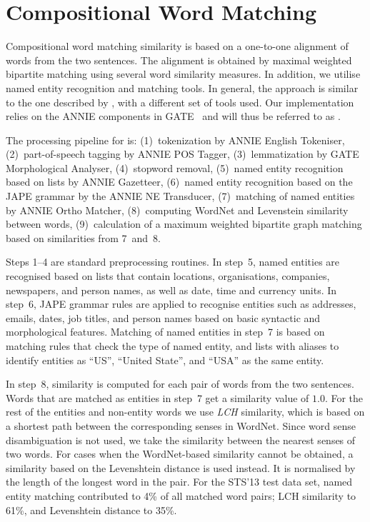 \section{Compositional Word Matching}
\label{gleb-feats}

Compositional word matching similarity is based on a one-to-one alignment of words from the two sentences. The alignment is obtained by maximal weighted bipartite matching using several word similarity measures. In addition, we utilise named entity recognition and matching tools. In general, the approach is similar to the one described by \citet{Karnick2012}, with a different set of tools used. 
Our implementation relies on the ANNIE components in GATE~\citep{CunninghamEA:02} 
and will thus be referred to as .

The processing pipeline for  is:  
(1)~tokenization by ANNIE English Tokeniser, 
(2)~part-of-speech tagging by ANNIE POS Tagger, 
(3)~lemmatization by GATE Morphological Analyser, 
(4)~stopword removal, 
(5)~named entity recognition based on lists by ANNIE Gazetteer, 
(6)~named entity recognition based on the JAPE grammar by the ANNIE NE Transducer, 
(7)~matching of named entities by ANNIE Ortho Matcher, 
(8)~computing WordNet and Levenstein similarity between words, 
(9)~calculation of a maximum weighted bipartite graph matching based on similarities from 7~and~8. 

Steps 1--4 are standard preprocessing routines. 
In step~5, named entities are recognised based on lists that contain locations, organisations, companies, newspapers, and person names, as well as date, time and currency units. 
In step~6, JAPE grammar rules are applied to recognise entities such as addresses, emails, dates, job titles, and person names based on basic syntactic and morphological features. 
Matching of named entities in step~7 is based on matching rules that check the type of named entity, and lists with aliases to identify entities as ``US'', ``United State'', and ``USA'' as the same entity. 

In step~8, similarity is computed for each pair of words from the two sentences. Words that are matched as entities in step~7 get a similarity value of $1.0$. 
For the rest of the entities and non-entity words we use \emph{LCH\/} \citep{Leacock1998} similarity, which is based on a shortest path between the corresponding senses in WordNet. Since word sense disambiguation is not used, we take the similarity between the nearest senses of two words.
For cases when the WordNet-based similarity cannot be obtained, a similarity based on the Levenshtein distance \citep{Levenshtein:66} is used instead. It is normalised by the length of the longest word in the pair. For the STS'13 test data set, named entity matching contributed to 4\% of all matched word pairs; LCH similarity to 61\%, and Levenshtein distance to 35\%.

